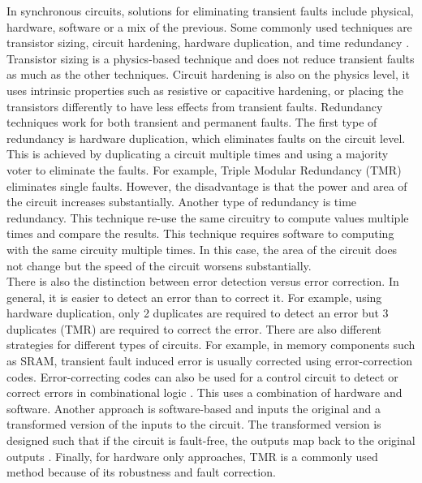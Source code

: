 \documentclass[12pt]{report}
\begin{document}
In synchronous circuits, solutions for eliminating transient faults include physical, hardware, software or a mix of the previous.  Some commonly used techniques are transistor sizing, circuit hardening, hardware duplication, and time redundancy \cite{Mitra_08_softerrors}.  Transistor sizing is a physics-based technique and does not reduce transient faults as much as the other techniques. Circuit hardening is also on the physics level, it uses intrinsic properties such as resistive or capacitive hardening, or placing the transistors differently to have less effects from transient faults.  Redundancy techniques work for both transient and permanent faults.  
The first type of redundancy is hardware duplication, which eliminates faults on the circuit level. This is achieved by duplicating a circuit multiple times and using a majority voter to eliminate the faults.  For example, Triple Modular Redundancy (TMR) eliminates single faults.  However, the disadvantage is that the power and area of the circuit increases substantially.  Another type of redundancy is time redundancy.  This technique re-use the same circuitry to compute values multiple times and compare the results. This technique requires software to computing with the same circuity multiple times. In this case, the area of the circuit does not change but the speed of the circuit worsens substantially. \\

There is also the distinction between error detection versus error correction. In general, it is easier to detect an error than to correct it. For example, using hardware duplication, only 2 duplicates are required to detect an error but 3 duplicates (TMR) are required to correct the error.  There are also different strategies for different types of circuits. For example, in memory components such as SRAM, transient fault induced error is usually corrected using error-correction codes.  Error-correcting codes can also be used for a control circuit to detect or correct errors in combinational logic \cite{McCluskey_99}.  This uses a combination of hardware and software.  Another approach is software-based and inputs the original and a transformed version of the inputs to the circuit.  The transformed version is designed such that if the circuit is fault-free, the outputs map back to the original outputs \cite{Mitra_softwareerror}.  Finally, for hardware only approaches, TMR is a commonly used method because of its robustness and fault correction. \\
\end{document}
